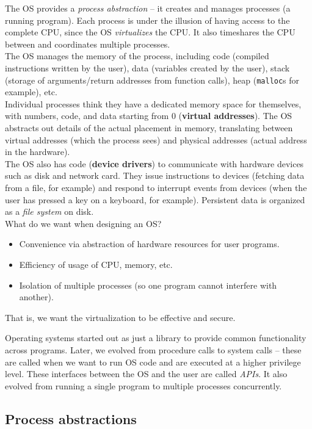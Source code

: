 \documentclass{article}
\begin{document}
		The OS provides a \emph{process abstraction} -- it creates and manages processes (a running program). Each process is under the illusion of having access to the complete CPU, since the OS \emph{virtualizes} the CPU. It also timeshares the CPU between and coordinates multiple processes.\\

		The OS manages the memory of the process, including code (compiled instructions written by the user), data (variables created by the user), stack (storage of arguments/return addresses from function calls), heap (\texttt{malloc}s for example), etc.\\
		Individual processes think they have a dedicated memory space for themselves, with numbers, code, and data starting from $0$ (\textbf{virtual addresses}). The OS abstracts out details of the actual placement in memory, translating between virtual addresses (which the process sees) and physical addresses (actual address in the hardware).\\

		The OS also has code (\textbf{device drivers}) to communicate with hardware devices such as disk and network card. They issue instructions to devices (fetching data from a file, for example) and respond to interrupt events from devices (when the user has pressed a key on a keyboard, for example). Persistent data is organized as a \emph{file system} on disk.\\

		What do we want when designing an OS?
		\begin{itemize}
			\item Convenience via abstraction of hardware resources for user programs.
			\item Efficiency of usage of CPU, memory, etc.
			\item Isolation of multiple processes (so one program cannot interfere with another).
		\end{itemize}
		That is, we want the virtualization to be effective and secure.

		Operating systems started out as just a library to provide common functionality across programs. Later, we evolved from procedure calls to system calls -- these are called when we want to run OS code and are executed at a higher privilege level. These interfaces between the OS and the user are called \emph{APIs}. It also evolved from running a single program to multiple processes concurrently.

	\subsection{Process abstractions}
\end{document}
